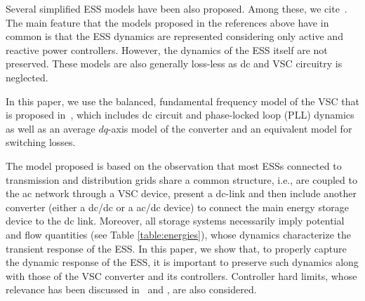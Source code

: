 \documentclass[journal, a4paper]{IEEEtran}
\begin{document}
Several simplified ESS models have been also proposed.  Among these, we
cite~\cite{pal:00, wu:12, sui:14, singh:13, fang:14}.  The main
feature that the models proposed in the references above have in
common is that the ESS dynamics are represented considering only
active and reactive power controllers.  However, the dynamics of the
ESS itself are not preserved.  These models are also generally
loss-less as dc and VSC circuitry is neglected.





In this paper, we use the balanced, fundamental frequency model of the
VSC that is proposed in~\cite{Chauduri:14, belmans:14, chauduri:11, Cole:2010, acha:13},
which includes dc circuit and phase-locked loop (PLL) dynamics as well as an 
average $dq$-axis model of the converter and an equivalent model for switching losses.

The model proposed is based on the observation that most ESSs
connected to transmission and distribution grids share a common
structure, i.e., are coupled to the ac network through a VSC device,
present a dc-link and then include another converter (either a dc/dc
or a ac/dc device) to connect the main energy storage device to the dc
link.  Moreover, all storage systems necessarily imply potential and
flow quantities (see Table \ref{table:energies}), whose dynamics
characterize the transient response of the ESS.  In this paper, we
show that, to properly capture the dynamic response of the ESS, it is
important to preserve such dynamics along with those of the VSC converter 
and its controllers.  Controller hard limits, whose relevance has been
discussed in~\cite{fang:14} and \cite{ortega:15}, are also considered.
\end{document}
